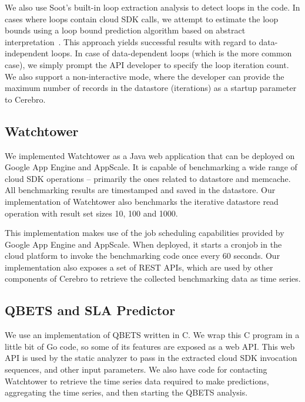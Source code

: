 We also use Soot's built-in loop extraction analysis
to detect loops in the code. In cases where loops contain cloud SDK calls, we attempt to estimate
the loop bounds using a loop bound prediction algorithm based on abstract interpretation~\cite{bygde2010static}. This
approach yields successful results with regard to data-independent loops. In case of data-dependent
loops (which is the more common case), we simply prompt the API developer to specify the loop iteration
count. We also support a non-interactive mode, where the developer can provide the maximum number of
records in the datastore (iterations) as a startup parameter to Cerebro.%

\subsection{Watchtower}
We implemented Watchtower as a Java web application that can be deployed on Google App Engine and
AppScale. It is capable of benchmarking a wide range of cloud SDK operations
-- primarily the ones related to datastore and memcache. All benchmarking results are timestamped and 
saved in the datastore. Our implementation of Watchtower also benchmarks the iterative datastore read operation
with result set sizes 10, 100 and 1000. 

This implementation makes use of the job scheduling capabilities provided by Google App
Engine and AppScale. When deployed, it starts a cronjob in the cloud platform to invoke the benchmarking code
once every 60 seconds. Our implementation also exposes a set of REST APIs, which
are used by other components of Cerebro to retrieve the collected benchmarking data as time series.

\subsection{QBETS and SLA Predictor}
We use an implementation of QBETS written in C. We wrap this C program in a little bit of Go code, so some 
of its features are exposed as a web API. This web API is used by the static analyzer to pass in the extracted
cloud SDK invocation sequences, and other input parameters. We also have code for contacting Watchtower 
to retrieve the time series data required to make predictions, aggregating the time series, and then 
starting the QBETS analysis. 

